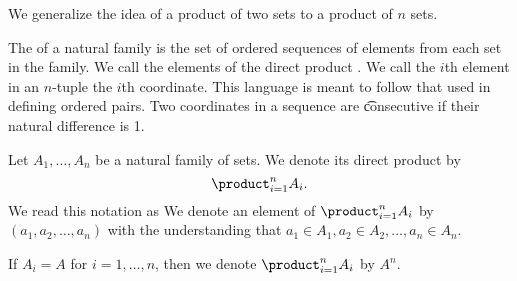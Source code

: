 

We generalize the idea of a product of two sets to a product of $n$ sets.


The  of a natural family is the set of ordered sequences of elements from each set in the family.
We call the elements of the direct product .
We call the $i$th element in an $n$-tuple the $i$th coordinate.
This language is meant to follow that used in defining ordered pairs.
Two coordinates in a sequence are \t{consecutive} if their natural difference is 1.


Let $A_1, \dots, A_n$ be a natural family
of sets. We denote its direct product by
\[
  \product_{i = 1}^{n} A_{i}.
\]
We read this notation as 
We denote an element of $\product_{i = 1}^{n} A_{i}$ by $(a_1, a_2, \dots, a_n)$ with the understanding that $a_1 \in A_1, a_2 \in A_2, \dots, a_n \in A_n$.

If $A_i = A$ for $i = 1, \dots, n$, then we denote
$\product_{i = 1}^{n} A_{i}$ by $A^n$.


\strats
